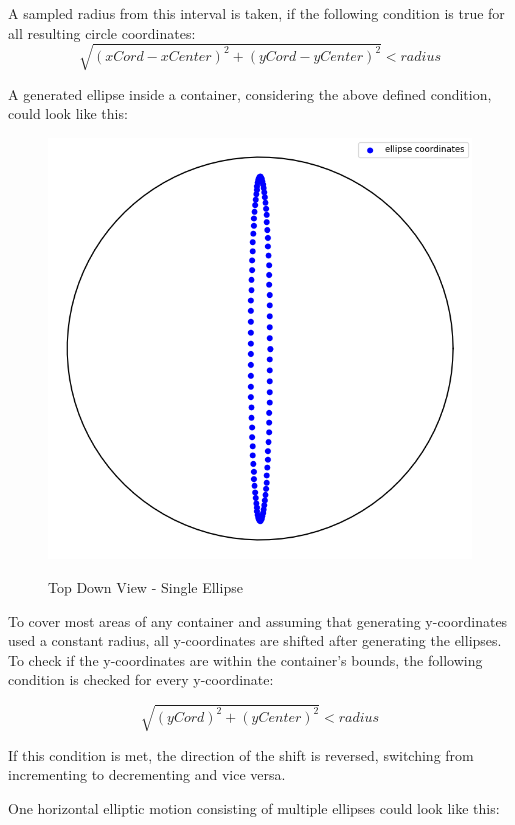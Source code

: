 A sampled radius from this interval is taken, if the following condition is true for all resulting circle coordinates:
\[\sqrt{(xCord - xCenter)^2 + (yCord - yCenter)^2} < radius\] 

A generated ellipse inside a container, considering the above defined condition, could look like this:

\begin{figure}[H]
    \includegraphics[scale=0.35]{Graphics/motions/ellipse.png}
    \centering
    \label{fig:foldingMotion1}
    \caption{Top Down View - Single Ellipse}
\end{figure}


To cover most areas of any container and assuming that generating y-coordinates used a constant radius, all y-coordinates are shifted after generating the ellipses. 
To check if the y-coordinates are within the container's bounds, the following condition is checked for every y-coordinate:

\[\sqrt{(yCord)^2 + (yCenter)^2} < radius\]

If this condition is met, the direction of the shift is reversed, switching from incrementing to decrementing and vice versa.

One horizontal elliptic motion consisting of multiple ellipses could look like this:


